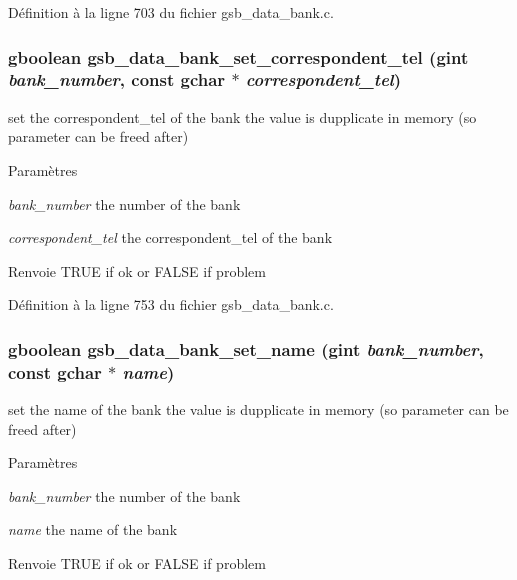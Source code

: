 Définition à la ligne 703 du fichier gsb\_\-data\_\-bank.c.

\subsubsection[{gsb\_\-data\_\-bank\_\-set\_\-correspondent\_\-tel}]{\setlength{\rightskip}{0pt plus 5cm}gboolean gsb\_\-data\_\-bank\_\-set\_\-correspondent\_\-tel (gint {\em bank\_\-number}, \/  const gchar $\ast$ {\em correspondent\_\-tel})}\label{gsb__data__bank_8h_a7f0eba26423ae9bc1625dec9965ade92}
set the correspondent\_\-tel of the bank the value is dupplicate in memory (so parameter can be freed after)


\begin{DoxyParams}{Paramètres}
\item[{\em bank\_\-number}]the number of the bank \item[{\em correspondent\_\-tel}]the correspondent\_\-tel of the bank\end{DoxyParams}
\begin{DoxyReturn}{Renvoie}
TRUE if ok or FALSE if problem 
\end{DoxyReturn}


Définition à la ligne 753 du fichier gsb\_\-data\_\-bank.c.

\subsubsection[{gsb\_\-data\_\-bank\_\-set\_\-name}]{\setlength{\rightskip}{0pt plus 5cm}gboolean gsb\_\-data\_\-bank\_\-set\_\-name (gint {\em bank\_\-number}, \/  const gchar $\ast$ {\em name})}\label{gsb__data__bank_8h_a0dff2c8d08fece8baf5ccba732d688c4}
set the name of the bank the value is dupplicate in memory (so parameter can be freed after)


\begin{DoxyParams}{Paramètres}
\item[{\em bank\_\-number}]the number of the bank \item[{\em name}]the name of the bank\end{DoxyParams}
\begin{DoxyReturn}{Renvoie}
TRUE if ok or FALSE if problem 
\end{DoxyReturn}


